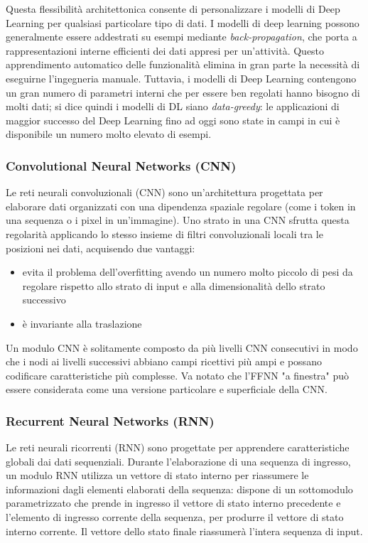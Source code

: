 \par Questa flessibilità architettonica consente di personalizzare i modelli di Deep Learning per qualsiasi particolare tipo di dati. I modelli di deep learning possono generalmente essere addestrati su esempi mediante \textit{back-propagation}, che porta a rappresentazioni interne efficienti dei dati appresi per un'attività. Questo apprendimento automatico delle funzionalità elimina in gran parte la necessità di eseguirne l'ingegneria manuale. Tuttavia, i modelli di Deep Learning contengono un gran numero di parametri interni che per essere ben regolati hanno bisogno di molti dati; si dice quindi i modelli di DL siano \textit{data-greedy}: le applicazioni di maggior successo del Deep Learning fino ad oggi sono state in campi in cui è disponibile un numero molto elevato di esempi.

\subsubsection{Convolutional Neural Networks (CNN)}

Le reti neurali convoluzionali (CNN) sono un'architettura progettata per elaborare dati organizzati con una dipendenza spaziale regolare (come i token in una sequenza o i pixel in un'immagine). Uno strato in una CNN sfrutta questa regolarità applicando lo stesso insieme di filtri convoluzionali locali tra le posizioni nei dati, acquisendo due vantaggi: 
\begin{itemize}
	\item evita il problema dell'overfitting avendo un numero molto piccolo di pesi da regolare rispetto allo strato di input e alla dimensionalità dello strato successivo
	\item è invariante alla traslazione
\end{itemize}

Un modulo CNN è solitamente composto da più livelli CNN consecutivi in modo che i nodi ai livelli successivi abbiano campi ricettivi più ampi e possano codificare caratteristiche più complesse. Va notato che l'FFNN "a finestra" può essere considerata come una versione particolare e superficiale della CNN.

\subsubsection{Recurrent Neural Networks (RNN)}

Le reti neurali ricorrenti (RNN) sono progettate per apprendere caratteristiche globali dai dati sequenziali. Durante l'elaborazione di una sequenza di ingresso, un modulo RNN utilizza un vettore di stato interno per riassumere le informazioni dagli elementi elaborati della sequenza: dispone di un sottomodulo parametrizzato che prende in ingresso il vettore di stato interno precedente e l'elemento di ingresso corrente della sequenza, per produrre il vettore di stato interno corrente. Il vettore dello stato finale riassumerà l'intera sequenza di input.

